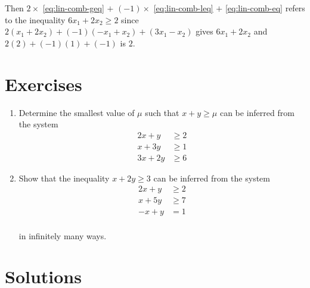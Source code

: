 \documentclass[]{book}
\providecommand{\tightlist}{%
  \setlength{\itemsep}{0pt}\setlength{\parskip}{0pt}}
\theoremstyle{definition}
\theoremstyle{definition}
\theoremstyle{remark}
\begin{document}
Then \(2\times\) \eqref{eq:lin-comb-geq} \(+\) \((-1)\times\)
\eqref{eq:lin-comb-leq} \(+\) \eqref{eq:lin-comb-eq} refers to the
inequality \(6x_1+2x_2 \geq 2\) since
\(2(x_1+2x_2)+(-1)(-x_1+x_2)+(3x_1 - x_2)\) gives \(6x_1 + 2x_2\) and
\(2(2) + (-1)(1) + (-1)\) is \(2\).

\section*{Exercises}\label{exercises-2}

\begin{enumerate}
\def\labelenumi{\arabic{enumi}.}
\tightlist
\item
  Determine the smallest value of \(\mu\) such that \(x + y \geq \mu\)
  can be inferred from the system
  \begin{align*}
  2x + y & \geq 2 \\
  x + 3y & \geq 1 \\
  3x + 2y & \geq 6
  \end{align*}
\item
  Show that the inequality \(x + 2y \geq 3\) can be inferred from the
  system
  \begin{align*}
  2x + y & \geq 2 \\
  x + 5y & \geq 7 \\
  -x + y & = 1 \\
  \end{align*}

  in infinitely many ways.
\end{enumerate}

\section*{Solutions}\label{solutions-2}
\end{document}
